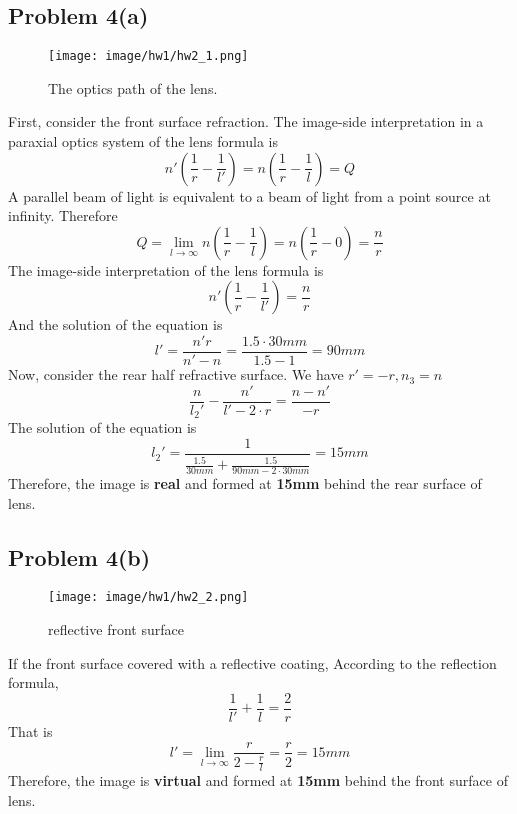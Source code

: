\documentclass{article}
\begin{document}
\subsection{Problem 4(a)}
\begin{figure}[H]
    \centering
    \texttt{[image: image/hw1/hw2\_1.png]}
    \caption{The optics path of the lens.}
    \label{fig:hw1_1}
\end{figure}
First, consider the front surface refraction.
The image-side interpretation in a paraxial optics system of the lens formula is
\begin{equation}
    n'\left(\frac{1}{r}-\frac{1}{l'}\right)=n\left(\frac{1}{r}-\frac{1}{l}\right)=Q
\end{equation}
A parallel beam of light is equivalent to a beam of light from a point source at infinity. Therefore
\begin{equation}
    Q=\lim_{l\to\infty}n\left(\frac{1}{r}-\frac{1}{l}\right)=n\left(\frac{1}{r}-0\right)=\frac{n}{r}
\end{equation}
The image-side interpretation of the lens formula is
\begin{equation}
    n'\left(\frac{1}{r}-\frac{1}{l'}\right)=\frac{n}{r}
\end{equation}
And the solution of the equation is
\begin{equation}
    \boxed{l'=\frac{n'r}{n'-n}=\frac{1.5\cdot 30mm}{1.5-1}=90mm}
\end{equation}
Now, consider the rear half refractive surface. We have $r'=-r,n_3=n$
\begin{equation}
    \frac{n}{l_2'}-\frac{n'}{l'-2\cdot r}=\frac{n-n'}{-r}
\end{equation}
The solution of the equation is
\begin{equation}
    \boxed{l_2'=\frac{1}{\frac{1.5}{30mm}+\frac{1.5}{90mm-2\cdot30mm}} = 15mm}
\end{equation}
Therefore, the image is \textbf{real} and formed at \textbf{15mm} behind the rear surface of lens.\\



\subsection{Problem 4(b)}

\begin{figure}[H]
    \centering
    \texttt{[image: image/hw1/hw2\_2.png]}
    \caption{reflective front surface}
    \label{fig:hw1_2}
\end{figure}
If the front surface covered with a reflective coating, According to the reflection formula,
\begin{equation}
    \frac{1}{l'}+\frac{1}{l}=\frac{2}{r}
\end{equation}
That is
\begin{equation}
    \boxed{l'=\lim_{l\to\infty}\frac{r}{2-\frac{r}{l}}=\frac{r}{2}=15mm}
\end{equation}
Therefore, the image is \textbf{virtual} and formed at \textbf{15mm} behind the front surface of lens.
\end{document}
